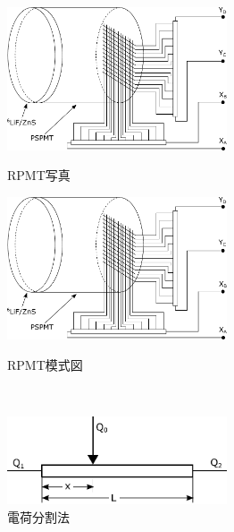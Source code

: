 \begin{figure}[h]
\begin{minipage}{0.5\hsize}
\begin{center}
\includegraphics[width=6.5cm]{detector/detector_fig2.pdf}
\caption{RPMT写真}
\end{center}
\end{minipage}
\begin{minipage}{0.5\hsize}
\begin{center}
\includegraphics[width=6.5cm]{detector/detector_fig2.pdf}
\caption{RPMT模式図}
\end{center}
\end{minipage}\\
\begin{minipage}{0.5\hsize}
\begin{center}
\includegraphics[width=6.5cm]{detector/detector_fig3.pdf}
\caption{電荷分割法}
\end{center}
\end{minipage}
\end{figure}





